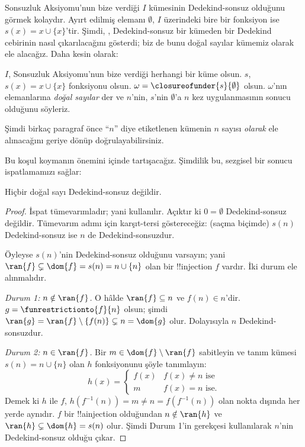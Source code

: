 Sonsuzluk Aksiyomu'nun bize verdiği $I$ kümesinin Dedekind-sonsuz olduğunu
görmek kolaydır. Ayırt edilmiş elemanı $\emptyset$, $I$ üzerindeki bire bir
fonksiyon ise $s(x)=x\cup\{x\}$'tir. Şimdi,
,
Dedekind-sonsuz bir kümeden bir Dedekind cebirinin nasıl çıkarılacağını
gösterdi; biz de bunu doğal sayılar kümemiz olarak ele alacağız. Daha kesin
olarak:
\begin{defn}
$I$, Sonsuzluk Aksiyomu'nun bize verdiği herhangi bir küme olsun. $s$,
$s(x)=x\cup\{x\}$ fonksiyonu olsun. $\omega =
\closureofunder{s}{\emptyset}$ olsun. $\omega$'nın elemanlarına
\emph{doğal sayılar} der ve $n$'nin, $s$'nin $\emptyset$'a $n$ kez
uygulanmasının sonucu olduğunu söyleriz.
\end{defn}

Şimdi birkaç paragraf önce ``$n$'' diye etiketlenen kümenin $n$ sayısı
\emph{olarak} ele alınacağını geriye dönüp doğrulayabilirsiniz.

Bu koşul koymanın önemini  içinde tartışacağız.
Şimdilik bu, sezgisel bir sonucu ispatlamamızı sağlar:

\begin{prop}
Hiçbir doğal sayı Dedekind-sonsuz değildir.
\end{prop}

\begin{proof}
İspat tümevarımladır; yani
 kullanılır.
Açıktır ki $0=\emptyset$ Dedekind-sonsuz değildir. Tümevarım adımı için
karşıt-tersi göstereceğiz: (saçma biçimde) $s(n)$ Dedekind-sonsuz ise $n$
de Dedekind-sonsuzdur.

Öyleyse $s(n)$'nin Dedekind-sonsuz olduğunu varsayın; yani
$\ran{f}\subsetneq\dom{f}=s(n)=n\cup\{n\}$ olan bir !!{injection} $f$
vardır. İki durum ele alınmalıdır.

\emph{Durum 1: $n \notin \ran{f}$.} O hâlde $\ran{f}\subseteq n$ ve
$f(n)\in n$'dir. $g=\funrestrictionto{f}{n}$ olsun; şimdi
$\ran{g}=\ran{f}\setminus\{f(n)\}\subsetneq n=\dom{g}$ olur. Dolayısıyla
$n$ Dedekind-sonsuzdur.

\emph{Durum 2: $n \in \ran{f}$.} Bir
$m\in\dom{f}\setminus\ran{f}$ sabitleyin ve tanım kümesi
$s(n)=n\cup\{n\}$ olan $h$ fonksiyonunu şöyle tanımlayın:
\[
h(x) =
	\begin{cases}
		f(x) & \text{$f(x) \neq n$ ise}\\
		m & \text{$f(x)=n$ ise.}
	\end{cases}
\]
Demek ki $h$ ile $f$, $h(f^{-1}(n))=m\neq n=f(f^{-1}(n))$ olan nokta
dışında her yerde aynıdır. $f$ bir !!a{injection} olduğundan
$n\notin\ran{h}$ ve $\ran{h}\subsetneq\dom{h}=s(n)$ olur. Şimdi Durum 1'in
gerekçesi kullanılarak $n$'nin Dedekind-sonsuz olduğu çıkar.
\end{proof}

